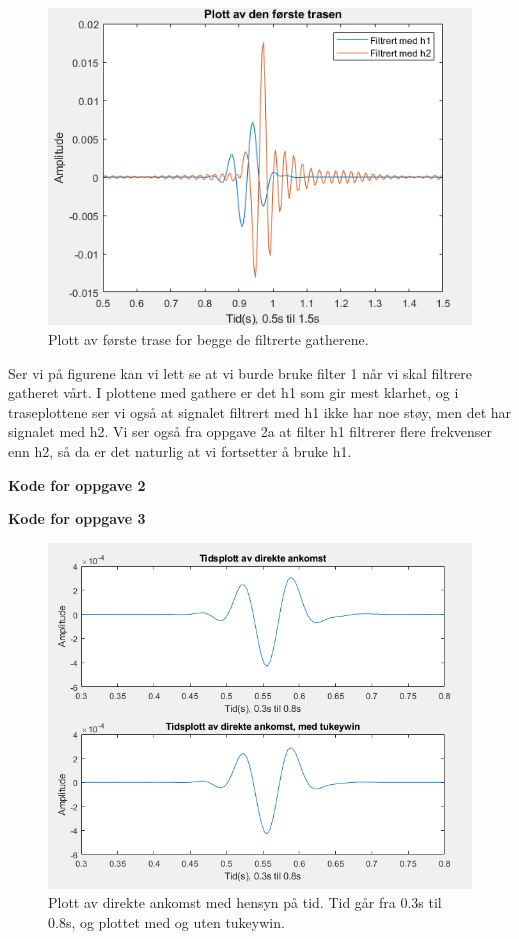 \documentclass[11pt]{article}
\begin{document}
\begin{figure}[H]
\includegraphics[scale=0.9]{2c_forstetrase.png}
\caption{Plott av første trase for begge de filtrerte gatherene. }
\end{figure}

Ser vi på figurene kan vi lett se at vi burde bruke filter 1 når vi skal filtrere gatheret vårt. I plottene med gathere er det h1 som gir mest klarhet, og i traseplottene ser vi også at signalet filtrert med h1 ikke har noe støy, men det har signalet med h2. Vi ser også fra oppgave 2a at filter h1 filtrerer flere frekvenser enn h2, så da er det naturlig at vi fortsetter å bruke h1.

\textbf{Kode for oppgave 2}


\textbf{Kode for oppgave 3}
\begin{figure}[H]
\includegraphics[scale=0.8]{3b_ankomst.png}
\caption{Plott av direkte ankomst med hensyn på tid. Tid går fra 0.3s til 0.8s, og plottet med og uten tukeywin.}
\end{figure}
\end{document}
